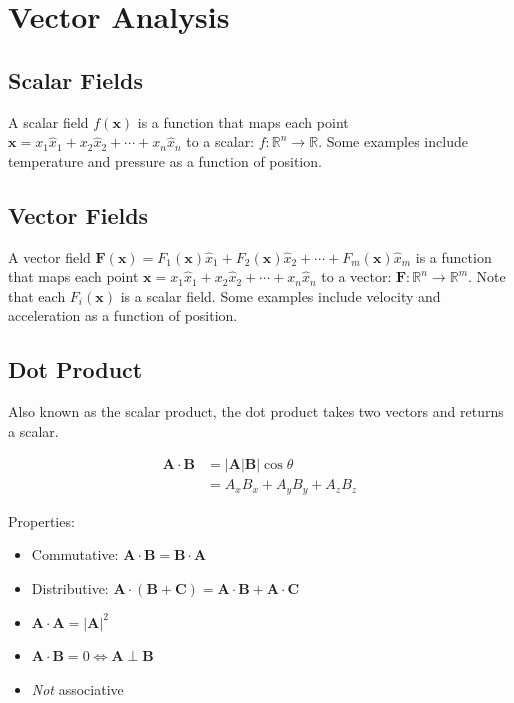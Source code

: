 \section{Vector Analysis}

\subsection{Scalar Fields}

A scalar field $f(\mathbf{x})$ is a function that maps each point $\mathbf{x} = x_1\hat{x}_1 + x_2\hat{x}_2 + \cdots + x_n\hat{x}_n$ to a scalar: $f: \mathbb{R}^n \to \mathbb{R}$. Some examples include temperature and pressure as a function of position.

\subsection{Vector Fields}

A vector field $\mathbf{F}(\mathbf{x}) = F_1(\mathbf{x})\hat{x}_1 + F_2(\mathbf{x})\hat{x}_2 + \cdots + F_m(\mathbf{x})\hat{x}_m$ is a function that maps each point $\mathbf{x} = x_1\hat{x}_1 + x_2\hat{x}_2 + \cdots + x_n\hat{x}_n$ to a vector: $\mathbf{F}: \mathbb{R}^n \to \mathbb{R}^m$. Note that each $F_i(\mathbf{x})$ is a scalar field. Some examples include velocity and acceleration as a function of position.

\subsection{Dot Product}

Also known as the scalar product, the dot product takes two vectors and returns a scalar.

\begin{align*}
    \mathbf{A} \cdot \mathbf{B} & = |\mathbf{A}|\mathbf{B}|\cos\theta \\
                                & = A_x B_x + A_y B_y + A_z B_z
\end{align*}

Properties:

\begin{itemize}
    \item Commutative: $\mathbf{A}\cdot\mathbf{B} = \mathbf{B}\cdot\mathbf{A}$
    \item Distributive: $\mathbf{A}\cdot(\mathbf{B}+\mathbf{C}) = \mathbf{A}\cdot\mathbf{B} + \mathbf{A}\cdot\mathbf{C}$
    \item $\mathbf{A}\cdot\mathbf{A} = |\mathbf{A}|^2$
    \item $\mathbf{A}\cdot\mathbf{B} = 0 \iff \mathbf{A} \perp \mathbf{B}$
    \item \emph{Not} associative
\end{itemize}

